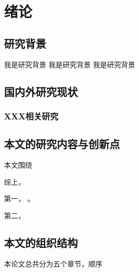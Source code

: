 \chapter{绪论}
\label{chapter:intro}

\section{研究背景}
我是研究背景
我是研究背景
我是研究背景


\section{国内外研究现状}
\subsection{XXX相关研究}




\section{本文的研究内容与创新点}

本文围绕


综上， 

第一， 。

第二， 


\section{本文的组织结构}



本论文总共分为五个章节，顺序

